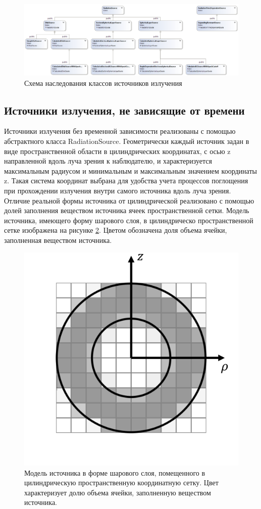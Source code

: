 \begin{figure}[h]
	\centering
	\includegraphics[width=14.5 cm]{./fig/radiationSource2.png} 
	\caption{Схема наследования классов источников излучения}
	\label{radiationSource}
\end{figure}

\subsection{Источники излучения, не зависящие от времени}\label{sourcesSection}
Источники излучения без временной зависимости реализованы с помощью абстрактного класса RadiationSource. Геометрически каждый источник задан в виде пространственной области в цилиндрических координатах, с осью z направленной вдоль луча зрения к наблюдателю, и характеризуется максимальным радиусом и минимальным и максимальным значением координаты z. Такая система координат выбрана для удобства учета процессов поглощения при прохождении излучения внутри самого источника вдоль луча зрения. Отличие реальной формы источника от цилиндрической реализовано с помощью долей заполнения веществом источника ячеек пространственной сетки. Модель источника, имеющего форму шарового слоя, в цилиндрическо пространственной сетке изображена на рисунке \ref{sphericalLayer}. Цветом обозначена доля объема ячейки, заполненная веществом источника.

\begin{figure}
	\centering
	\includegraphics[width=10.5 cm]{./fig/sphericalSource.png} 
	\caption{Модель источника в форме шарового слоя, помещенного в цилиндрическую пространственную координатную сетку. Цвет характеризует долю объема ячейки, заполненную веществом источника.}
	\label{sphericalLayer}
\end{figure}

